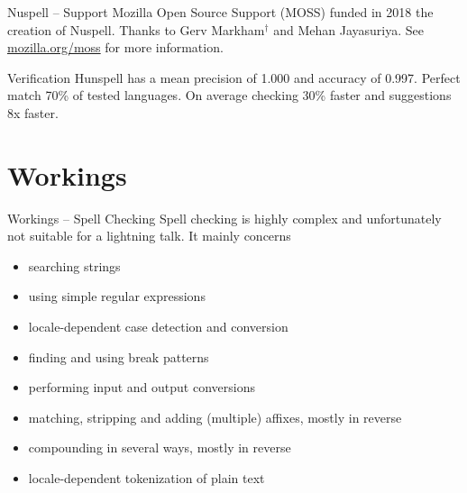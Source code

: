 \documentclass{beamer}
\begin{document}
\begin{frame}{Nuspell – Support}
Mozilla Open Source Support (MOSS) funded in 2018 the creation of Nuspell. Thanks to Gerv Markham$^†$ and Mehan Jayasuriya. See \href{https://mozilla.org/moss}{mozilla.org/moss} for more information.
\begin{figure}
\centering
\def\svgwidth{.75\columnwidth}

\end{figure}
Verification Hunspell has a mean precision of 1.000 and accuracy of 0.997. Perfect match 70\% of tested languages. On average checking 30\% faster and suggestions 8x faster.
\end{frame}



\section{Workings}

\begin{frame}{Workings – Spell Checking}
Spell checking is \alert{highly complex} and unfortunately not suitable for a lightning talk. It mainly concerns
\begin{itemize}
\item searching strings
\item using simple regular expressions
\item locale-dependent case detection and conversion
\item finding and using break patterns
\item performing input and output conversions
\item matching, stripping and adding (multiple) affixes, mostly in reverse
\item compounding in several ways, mostly in reverse
\item locale-dependent tokenization of plain text
\end{itemize}
\end{frame}
\end{document}
